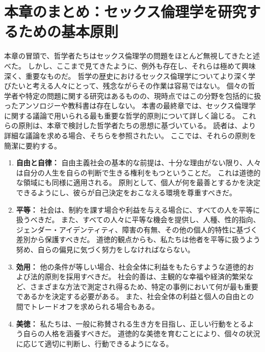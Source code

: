 \documentclass[paper=a4,book,openany]{jlreq}
\begin{document}
\section{本章のまとめ：セックス倫理学を研究するための基本原則}

本章の冒頭で、哲学者たちはセックス倫理学の問題をほとんど無視してきたと述べた。
しかし、ここまで見てきたように、例外も存在し、それらは極めて興味深く、重要なものだ。
哲学の歴史におけるセックス倫理学についてより深く学びたいと考える人々にとって、残念ながらその作業は容易ではない。
個々の哲学者や特定の問題に関する研究はあるものの、現時点ではこの分野を包括的に扱ったアンソロジーや教科書は存在しない。
本書の最終章では、セックス倫理学に関する議論で用いられる最も重要な哲学的原則について詳しく論じる。
これらの原則は、本章で検討した哲学者たちの思想に基づいている。
読者は、より詳細な議論を求める場合、そちらを参照されたい。
ここでは、それらの原則を簡潔に要約する。

\begin{enumerate}
    \item \textbf{自由と自律：}
    自由主義社会の基本的な前提は、十分な理由がない限り、人々は自分の人生を自らの判断で生きる権利をもつということだ。
これは道徳的な領域にも同様に適用される。
原則として、個人が何を最善とするかを決定できるようにし、彼らが自己決定をおこなえる環境を尊重すべきだ。

    \item \textbf{平等：}
    社会は、制約を課す場合や利益を与える場合に、すべての人を平等に扱うべきだ。
また、すべての人々に平等な機会を提供し、人種、性的指向、ジェンダー・アイデンティティ、障害の有無、その他の個人的特性に基づく差別から保護すべきだ。
道徳的観点からも、私たちは他者を平等に扱うよう努め、自らの偏見に気づく努力をしなければならない。

    \item \textbf{効用：}
    他の条件が等しい場合、社会全体に利益をもたらすような道徳的および法的原則を採用すべきだ。
社会的善は、主観的な幸福や経済的繁栄など、さまざまな方法で測定され得るため、特定の事例において何が最も重要であるかを決定する必要がある。
また、社会全体の利益と個人の自由との間でトレードオフを求められる場合もある。

    \item \textbf{美徳：}
    私たちは、一般に称賛される生き方を目指し、正しい行動をとるよう自らの人格を涵養すべきだ。
道徳的な美徳を育むことにより、個々の状況に応じて適切に判断し、行動できるようになる。

\end{enumerate}
\end{document}
